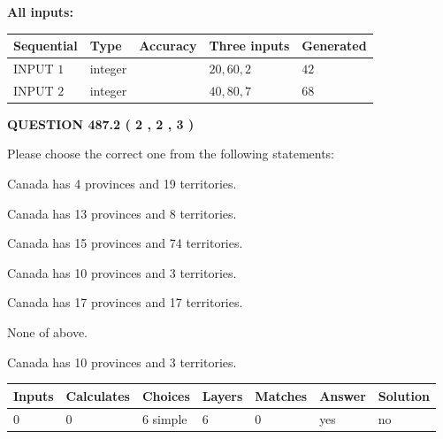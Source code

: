 \documentclass[12pt]{article}
\begin{document}
   
   
   
\noindent\vspace{0.1in}\hspace{-0.08in} {\textbf{\Large{All inputs: }}}
   
   
  
  
\noindent\begin{tabular}{|l|l|l|l|l|}
\hline
 Sequential & Type & Accuracy & Three inputs & Generated \\ 
\hline
 
 
  INPUT $  1 $ & integer &  & $
 20
 , 
 60
 , 
 2
 $ & $ 42 $ 
 \\  \hline  
 
 
  INPUT $  2 $ & integer &  & $
 40
 , 
 80
 , 
 7
 $ & $ 68 $ 
 \\  \hline  
 \end{tabular}
   
   
  
\vspace{0.2in}
  
{\textbf{\Large{QUESTION
487.2 
 ( 2 , 2 , 3 )
}}}
  
  
Please choose the correct one from the following statements:
 
 
Canada has   4 provinces and  19 territories.
 
 
Canada has  13 provinces and  8 territories.
 
 
Canada has  15 provinces and  74 territories.
 
 
Canada has 10  provinces and 3 territories.
 
 
Canada has  17 provinces and  17 territories.
 
 
 None of above.
 
 
\noindent{}
 
 
Canada has 10  provinces and 3 territories.
 
 
\noindent{}
 
 
   
   
   
   
\noindent\begin{tabular}{|l|l|l|l|l|l|l|}
 \hline
Inputs & Calculates & Choices & Layers & Matches & Answer & Solution \\ \hline
 0  & 
 0  & 
 6
  simple  
  & 
 6  & 
 0  & 
  yes & 
  no 
  \\ \hline
 \end{tabular}
   
\end{document}
